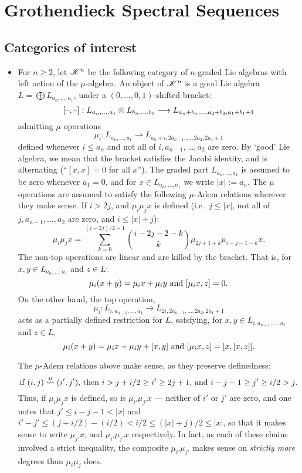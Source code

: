 \documentclass[11pt]{article}
\newcommand{\LL}[1]{{\scrK}^{#1}}%
\newcommand{\produces}[1]{\overset{#1}{\rightsquigarrow}}
\begin{document}
\section*{Grothendieck Spectral Sequences}
\subsection*{Categories of interest}
\begin{itemize}
\setlength{\parindent}{.25in}
\item For $n\geq2$, let $\LL{n}$ be the following category of $n$-graded Lie algebras with left action of the $\mu$-algebra. An object of $\LL{n}$ is a good Lie algebra $L=\bigoplus L_{a_n,\ldots,a_1}$, under a $(0,\ldots,0,1)$-shifted bracket:
\[[\textup{--},\textup{--}]:L_{a_n,\ldots,a_1}\otimes L_{b_n,\ldots,b_1}\longrightarrow L_{a_n+b_n,\ldots,a_2+b_2,a_1+b_1+1}\]
admitting $\mu$ operations
\[\mu_i:L_{a_n,\ldots,a_1}\to L_{a_n+i,2a_{n-1},\ldots,2a_2,2a_1+1}\]
defined whenever $i\leq a_n$ and not all of $i,a_{n-1},\ldots,a_{2}$ are zero. By `good' Lie algebra, we mean that the bracket satisfies the Jacobi identity, and is alternating (``$[x,x]=0$ for all $x$'').
The graded part $L_{a_n,\ldots,a_1}$ is assumed to be zero whenever $a_1=0$, and for $x\in L_{a_n,\ldots,a_1}$ we write $|x|:=a_n$. The $\mu$ operations are assumed to satisfy the following $\mu$-Adem relations wherever they make sense. If $i>2j$, and $\mu_i\mu_jx$ is defined (i.e.\ $j\leq|x|$, not all of $j,a_{n-1},\ldots,a_2$ are zero, and $i\leq|x|+j$):
\[\mu_i\mu_jx=\sum_{k=0}^{(i-2j)/2-1}{i-2j-2-k\choose k}\mu_{2j+1+k}\mu_{i-j-1-k}x.\]
The non-top operations are linear and are killed by the bracket.
That is, for $x,y\in L_{a_n,\ldots,a_1}$ and $z\in L$: \[\mu_i{(x+y)}=\mu_i{x}+\mu_i{y}\textup{ and }[\mu_i{x},z]=0.\]
On the other hand, the top operation, 
\[\mu_i:L_{i, a_{n-1},\ldots,a_1}\to L_{2i, 2a_{n-1},\ldots,2a_2,2a_1+1}\]
acts as a partially defined restriction for $L$, satsfying, for $x,y\in L_{i, a_{n-1},\ldots,a_1}$ and $z\in L$,
\[\mu_i(x+y)=\mu_ix+\mu_iy+[x,y]\textup{ and }[\mu_{i}x,z]=[x,[x,z]].\]

\begin{shaded}\noindent
The $\mu$-Adem relations above make sense, as they preserve definedness:
\[\textup{if $(i,j)\produces{\mu}(i',j')$, then $i>j+i/2\geq i'\geq2j+1$, and $i-j-1\geq j'\geq i/2>j$.}\]
Thus, if $\mu_i\mu_jx$ is defined, so is $\mu_{i'}\mu_{j'}x$ --- neither of $i'$ or $j'$ are zero, and one notes that $j'\leq i-j-1<|x|$ and $i'-j'\leq (j+i/2)-(i/2)<i/2\leq(|x|+j)/2\leq |x|$, so that it makes sense to write $\mu_{j'}x$, and $\mu_{i'}\mu_{j'}x$ respectively. In fact, as each of these chains involved a strict inequality, the composite $\mu_{i'}\mu_{j'}$ makes sense on \emph{strictly more} degrees than $\mu_{i}\mu_{j}$ does.
\end{shaded}


\end{itemize}
\end{document}
